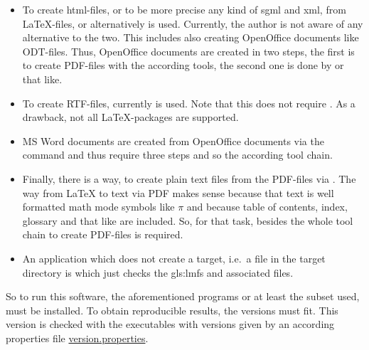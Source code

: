 \begin{itemize}
It is standard to endow a PDF-file with hyperlinks. 
To support this, the package  is required. 

****
\item
To create \gls{html}-files, 
or to be more precise any kind of \gls{sgml} and \gls{xml}, 
from \LaTeX-files,  or alternatively  is used. 
Currently, the author is not aware of any alternative to the two. 
This includes also creating OpenOffice documents like ODT-files. 
Thus, OpenOffice documents are created in two steps, 
the first is to create PDF-files with the according tools, 
the second one is done by  or that like. 
\item
To create RTF-files, currently  is used. 
Note that this does not require \pdflatex{}. 
As a drawback, not all \LaTeX-packages are supported. 
\item
MS Word documents are created from OpenOffice documents 
via the command  and thus require three steps 
and so the according tool chain. 
\item
Finally, there is a way, to create plain text files from the PDF-files 
via . 
The way from \LaTeX{} to text via PDF makes sense 
because that text is well formatted math mode symbols like $\pi$ 
and because table of contents, index, glossary and that like are included. 
So, for that task, besides  the whole tool chain to create
PDF-files is required. 
\item
An application which does not create a target, 
i.e.~a file in the target directory is  
which just checks the \glspl{gls:lmf} and associated files. 
\end{itemize}

So to run this software, the aforementioned programs 
or at least the subset used, must be installed.
To obtain reproducible results, the versions must fit.
This version is checked with the executables with versions given by 
an according properties file 
\href{\urlSite fromMain/version.properties}{version.properties}. 



